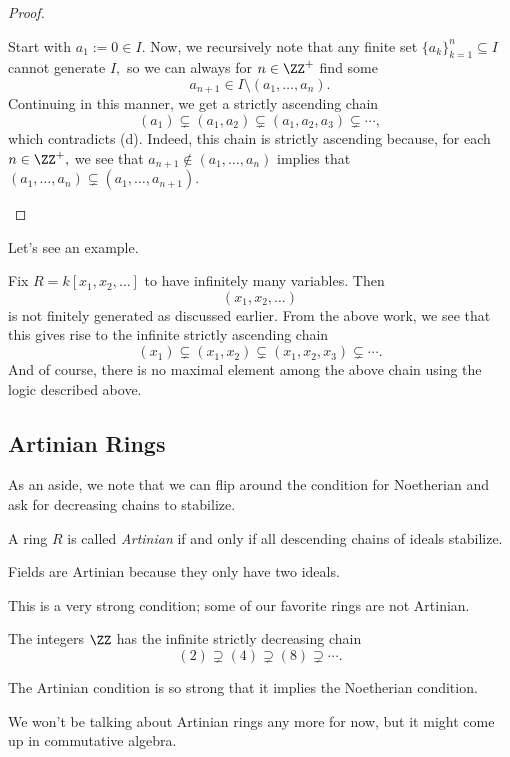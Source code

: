 \documentclass[../notes.tex]{subfiles}
\begin{document}
\begin{proof}
\begin{itemize}
		Start with $a_1:=0\in I.$ Now, we recursively note that any finite set $\{a_k\}_{k=1}^n\subseteq I$ cannot generate $I,$ so we can always for $n\in\ZZ^+$ find some
		\[a_{n+1}\in I\setminus(a_1,\ldots,a_n).\]
		Continuing in this manner, we get a strictly ascending chain
		\[(a_1)\subsetneq(a_1,a_2)\subsetneq(a_1,a_2,a_3)\subsetneq\cdots,\]
		which contradicts (d). Indeed, this chain is strictly ascending because, for each $n\in\ZZ^+,$ we see that $a_{n+1}\notin(a_1,\ldots,a_n)$ implies that $(a_1,\ldots,a_n)\subsetneq(a_1,\ldots,a_{n+1}).$
		\qedhere
	\end{itemize}
\end{proof}
Let's see an example.
\begin{ex}
	Fix $R=k[x_1,x_2,\ldots]$ to have infinitely many variables. Then
	\[(x_1,x_2,\ldots)\]
	is not finitely generated as discussed earlier. From the above work, we see that this gives rise to the infinite strictly ascending chain
	\[(x_1)\subsetneq(x_1,x_2)\subsetneq(x_1,x_2,x_3)\subsetneq\cdots.\]
	And of course, there is no maximal element among the above chain using the logic described above.
\end{ex}

\subsection{Artinian Rings}
As an aside, we note that we can flip around the condition for Noetherian and ask for decreasing chains to stabilize.
\begin{definition}[Artinian]
	A ring $R$ is called \textit{Artinian} if and only if all descending chains of ideals stabilize.
\end{definition}
\begin{example}
	Fields are Artinian because they only have two ideals.
\end{example}
This is a very strong condition; some of our favorite rings are not Artinian.
\begin{nex}
	The integers $\ZZ$ has the infinite strictly decreasing chain
	\[(2)\supsetneq(4)\supsetneq(8)\supsetneq\cdots.\]
\end{nex}
\begin{remark}
	The Artinian condition is so strong that it implies the Noetherian condition.
\end{remark}
We won't be talking about Artinian rings any more for now, but it might come up in commutative algebra.
\end{document}
